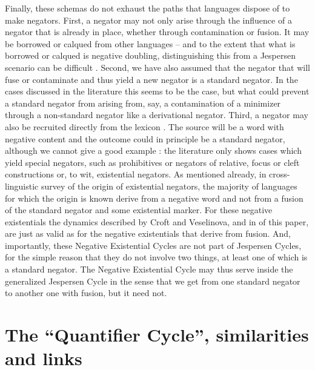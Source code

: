 ﻿\documentclass[output=paper]{langsci/langscibook}
\begin{document}
Finally, these schemas do not exhaust the paths that languages dispose of
to make negators. First, a negator may not only arise through the influence
of a negator that is already in place, whether through contamination or
fusion. It may be borrowed or calqued from other languages – and to the
extent that what is borrowed or calqued is negative doubling,
distinguishing this from a Jespersen scenario can be difficult 
\parencite[cp.][]{AuweraVossen2015}. Second, we have also assumed that the
negator
that will fuse or contaminate and thus yield a new negator is a standard
negator. In the cases discussed in the literature this seems to be the
case, but what could prevent a standard negator from arising from, say, a
contamination of a minimizer through a non-standard negator like a
derivational negator. Third, a negator may also be recruited directly from
the lexicon \parencite[cp.][74]{Auwera2010}. The source will be a
word with negative content and the outcome could in principle be a standard
negator, although we cannot give a good example
\parencite[cp.][75, 90--91]{Auwera2010}: the literature
\parencite[e.g.][292--339]{Gelderen2011} only shows cases which yield special
negators, such as prohibitives or negators of relative, focus or cleft
constructions \citep[917]{Givon1973} or, to wit, existential negators. As
mentioned already, in  cross-linguistic survey of
the origin of existential negators, the majority of languages for which the
origin is known derive from a negative word and not from a fusion of the
standard negator and some existential marker. For these negative
existentials the dynamics described by Croft and Veselinova, and in
 of this paper, are just as valid as for the negative
existentials that derive from fusion. And, importantly, these Negative
Existential Cycles are not part of Jespersen Cycles, for the simple reason
that they do not involve two things, at least one of which is a standard
negator. The Negative Existential Cycle may thus serve inside the
generalized Jespersen Cycle in the sense that we get from one standard
negator to another one with fusion, but it need not.

\section{The ``Quantifier Cycle'', similarities and links}
\end{document}
